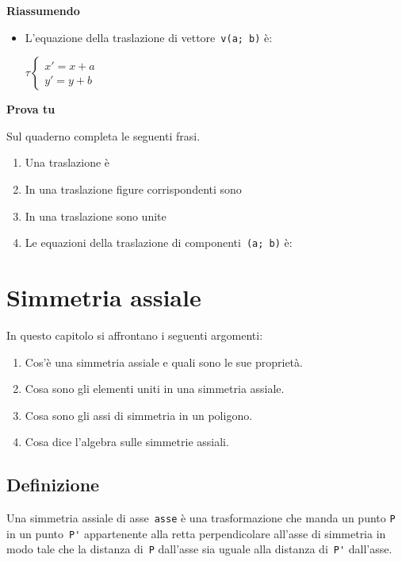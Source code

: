 \newpage %

\textbf{Riassumendo}
\begin{itemize}
\item L'equazione della traslazione di vettore~\lstinline{v(a; b)} è:

\(\tau \left \{
\begin{array}{l} x' = x + a \\ y' = y + b \end{array} \right .\)

\end{itemize}

\textbf{Prova tu}

Sul quaderno completa le seguenti frasi.
\begin{enumerate} [noitemsep]
\item Una traslazione è
\item In una traslazione figure corrispondenti sono
\item In una traslazione sono unite
\item Le equazioni della traslazione di componenti~\lstinline{(a; b)} è:
\end{enumerate}


\section{Simmetria assiale}
\label{sec:simmetria-assiale}
In questo capitolo si affrontano i seguenti argomenti:
\begin{enumerate} [noitemsep]
\item Cos'è una simmetria assiale e quali sono le sue proprietà.
\item Cosa sono gli elementi uniti in una simmetria assiale.
\item Cosa sono gli assi di simmetria in un poligono.
\item Cosa dice l'algebra sulle simmetrie assiali.
\end{enumerate}


\subsection{Definizione}

Una simmetria assiale di asse~\lstinline{asse} è una trasformazione che manda 
un punto
\lstinline{P} in un punto~\lstinline{P'} appartenente alla retta perpendicolare 
all'asse di
simmetria in modo tale che la distanza di~\lstinline{P} dall'asse
sia uguale alla distanza di~\lstinline{P'} dall'asse.

